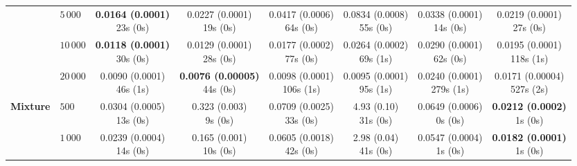 \begin{table}[htbp]
{\begin{tabular}{llcccccc}
 & $5{\,}000$ & \makecell{\textbf{0.0164 (0.0001)} \\ \scriptsize 23s (0s)} & \makecell{0.0227 (0.0001) \\ \scriptsize 19s (0s)} & \makecell{0.0417 (0.0006) \\ \scriptsize 64s (0s)} & \makecell{0.0834 (0.0008) \\ \scriptsize 55s (0s)} & \makecell{0.0338 (0.0001) \\ \scriptsize 14s (0s)} & \makecell{0.0219 (0.0001) \\ \scriptsize 27s (0s)} \\
 & $10{\,}000$ & \makecell{\textbf{0.0118 (0.0001)} \\ \scriptsize 30s (0s)} & \makecell{0.0129 (0.0001) \\ \scriptsize 28s (0s)} & \makecell{0.0177 (0.0002) \\ \scriptsize 77s (0s)} & \makecell{0.0264 (0.0002) \\ \scriptsize 69s (1s)} & \makecell{0.0290 (0.0001) \\ \scriptsize 62s (0s)} & \makecell{0.0195 (0.0001) \\ \scriptsize 118s (1s)} \\
 & $20{\,}000$ & \makecell{0.0090 (0.0001) \\ \scriptsize 46s (1s)} & \makecell{\textbf{0.0076 (0.00005)} \\ \scriptsize 44s (0s)} & \makecell{0.0098 (0.0001) \\ \scriptsize 106s (1s)} & \makecell{0.0095 (0.0001) \\ \scriptsize 95s (1s)} & \makecell{0.0240 (0.0001) \\ \scriptsize 279s (1s)} & \makecell{0.0171 (0.00004) \\ \scriptsize 527s (2s)} \\
\hline
\textbf{Mixture} & $500$ & \makecell{0.0304 (0.0005) \\ \scriptsize 13s (0s)} & \makecell{0.323 (0.003) \\ \scriptsize 9s (0s)} & \makecell{0.0709 (0.0025) \\ \scriptsize 33s (0s)} & \makecell{4.93 (0.10) \\ \scriptsize 31s (0s)} & \makecell{0.0649 (0.0006) \\ \scriptsize 0s (0s)} & \makecell{\textbf{0.0212 (0.0002)} \\ \scriptsize 1s (0s)} \\
 & $1{\,}000$ & \makecell{0.0239 (0.0004) \\ \scriptsize 14s (0s)} & \makecell{0.165 (0.001) \\ \scriptsize 10s (0s)} & \makecell{0.0605 (0.0018) \\ \scriptsize 42s (0s)} & \makecell{2.98 (0.04) \\ \scriptsize 41s (0s)} & \makecell{0.0547 (0.0004) \\ \scriptsize 1s (0s)} & \makecell{\textbf{0.0182 (0.0001)} \\ \scriptsize 1s (0s)} \\

\end{tabular}}
\end{table}
